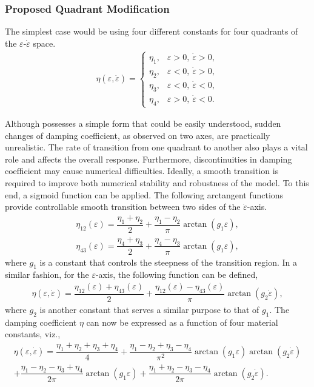 \subsubsection{Proposed Quadrant Modification}\label{sec:quadrant_damper}
The simplest case would be using four different constants for four quadrants of the $\varepsilon$-$\dot{\varepsilon}$ space.
\begin{gather}\label{eq:quadrant_damper}
\eta\left(\varepsilon,\dot\varepsilon\right)=\left\{\begin{array}{lc}
\eta_1,&\varepsilon>0,~\dot{\varepsilon}>0,\\
\eta_2,&\varepsilon<0,~\dot{\varepsilon}>0,\\
\eta_3,&\varepsilon<0,~\dot{\varepsilon}<0,\\
\eta_4,&\varepsilon>0,~\dot{\varepsilon}<0.
\end{array}\right.
\end{gather}

Although  possesses a simple form that could be easily understood, sudden changes of damping coefficient, as observed on two axes, are practically unrealistic. The rate of transition from one quadrant to another also plays a vital role and affects the overall response. Furthermore, discontinuities in damping coefficient may cause numerical difficulties. Ideally, a smooth transition is required to improve both numerical stability and robustness of the model. To this end, a sigmoid function can be applied. The following arctangent functions provide controllable smooth transition between two sides of the $\dot{\varepsilon}$-axis.
\begin{gather}
\eta_{12}\left(\varepsilon\right)=\dfrac{\eta_1+\eta_2}{2}+\dfrac{\eta_1-\eta_2}{\pi}\arctan\left(g_1\varepsilon\right),\\
\eta_{43}\left(\varepsilon\right)=\dfrac{\eta_4+\eta_3}{2}+\dfrac{\eta_4-\eta_3}{\pi}\arctan\left(g_1\varepsilon\right),
\end{gather}
where $g_1$ is a constant that controls the steepness of the transition region. In a similar fashion, for the $\varepsilon$-axis, the following function can be defined,
\begin{gather}
\eta\left(\varepsilon,\dot\varepsilon\right)=\dfrac{\eta_{12}\left(\varepsilon\right)+\eta_{43}\left(\varepsilon\right)}{2}+\dfrac{\eta_{12}\left(\varepsilon\right)-\eta_{43}\left(\varepsilon\right)}{\pi}\arctan\left(g_2\dot\varepsilon\right),
\end{gather}
where $g_2$ is another constant that serves a similar purpose to that of $g_1$. The damping coefficient $\eta$ can now be expressed as a function of four material constants, viz.,
\begin{multline}\label{eq:arctan_transition}
\eta\left(\varepsilon,\dot\varepsilon\right)=\dfrac{\eta_1+\eta_2+\eta_3+\eta_4}{4}+\dfrac{\eta_1-\eta_2+\eta_3-\eta_4}{\pi^2}\arctan\left(g_1\varepsilon\right)\arctan\left(g_2\dot\varepsilon\right)\\+\dfrac{\eta_1-\eta_2-\eta_3+\eta_4}{2\pi}\arctan\left(g_1\varepsilon\right)+\dfrac{\eta_1+\eta_2-\eta_3-\eta_4}{2\pi}\arctan\left(g_2\dot\varepsilon\right).
\end{multline}


